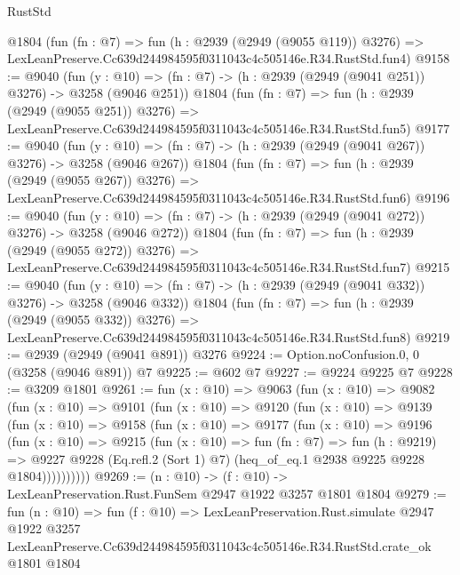 \begin{lexlean}{RustStd}
\begin{coremodule}
    @1804
    (fun (fn : @7) =>
    fun (h : @2939 (@2949 (@9055 @119)) @3276) =>
    LexLeanPreserve.Cc639d244984595f0311043c4c505146e.R34.RustStd.fun4)
@9158 := @9040
    (fun (y : @10) => (fn : @7) -> (h : @2939 (@2949 (@9041 @251)) @3276) -> @3258 (@9046 @251))
    @1804
    (fun (fn : @7) =>
    fun (h : @2939 (@2949 (@9055 @251)) @3276) =>
    LexLeanPreserve.Cc639d244984595f0311043c4c505146e.R34.RustStd.fun5)
@9177 := @9040
    (fun (y : @10) => (fn : @7) -> (h : @2939 (@2949 (@9041 @267)) @3276) -> @3258 (@9046 @267))
    @1804
    (fun (fn : @7) =>
    fun (h : @2939 (@2949 (@9055 @267)) @3276) =>
    LexLeanPreserve.Cc639d244984595f0311043c4c505146e.R34.RustStd.fun6)
@9196 := @9040
    (fun (y : @10) => (fn : @7) -> (h : @2939 (@2949 (@9041 @272)) @3276) -> @3258 (@9046 @272))
    @1804
    (fun (fn : @7) =>
    fun (h : @2939 (@2949 (@9055 @272)) @3276) =>
    LexLeanPreserve.Cc639d244984595f0311043c4c505146e.R34.RustStd.fun7)
@9215 := @9040
    (fun (y : @10) => (fn : @7) -> (h : @2939 (@2949 (@9041 @332)) @3276) -> @3258 (@9046 @332))
    @1804
    (fun (fn : @7) =>
    fun (h : @2939 (@2949 (@9055 @332)) @3276) =>
    LexLeanPreserve.Cc639d244984595f0311043c4c505146e.R34.RustStd.fun8)
@9219 := @2939 (@2949 (@9041 @891)) @3276
@9224 := Option.noConfusion.{0, 0} (@3258 (@9046 @891)) @7
@9225 := @602 @7
@9227 := @9224 @9225 @7
@9228 := @3209 @1801
@9261 := fun (x : @10) =>
  @9063
    (fun (x : @10) =>
    @9082
      (fun (x : @10) =>
      @9101
        (fun (x : @10) =>
        @9120
          (fun (x : @10) =>
          @9139
            (fun (x : @10) =>
            @9158
              (fun (x : @10) =>
              @9177
                (fun (x : @10) =>
                @9196
                  (fun (x : @10) =>
                  @9215
                    (fun (x : @10) =>
                    fun (fn : @7) =>
                    fun (h : @9219) =>
                    @9227
                      @9228
                      (Eq.refl.{2} (Sort 1) @7)
                      (heq_of_eq.{1} @2938 @9225 @9228 @1804))))))))))
@9269 := (n : @10) -> (f : @10) -> LexLeanPreservation.Rust.FunSem @2947 @1922 @3257 @1801 @1804
@9279 := fun (n : @10) =>
  fun (f : @10) =>
  LexLeanPreservation.Rust.simulate
    @2947
    @1922
    @3257
    LexLeanPreserve.Cc639d244984595f0311043c4c505146e.R34.RustStd.crate_ok
    @1801
    @1804
\end{coremodule}
\end{lexlean}
